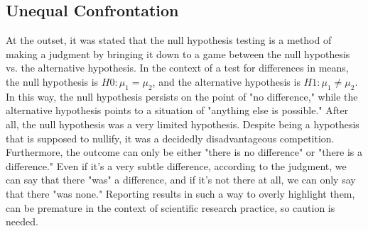\documentclass{ltjsbook}
\begin{document}
{\subsection{Unequal Confrontation}
At the outset, it was stated that the null hypothesis testing is a method of making a judgment by bringing it down to a game between the null hypothesis vs. the alternative hypothesis.
In the context of a test for differences in means, the null hypothesis is $H0:\mu_1=\mu_2$, and the alternative hypothesis is $H1:\mu_1\neq\mu_2$. In this way, the null hypothesis persists on the point of "no difference," while the alternative hypothesis points to a situation of "anything else is possible." After all, the null hypothesis was a very limited hypothesis. Despite being a hypothesis that is supposed to nullify, it was a decidedly disadvantageous competition. Furthermore, the outcome can only be either "there is no difference" or "there is a difference." Even if it's a very subtle difference, according to the judgment, we can say that there "was" a difference, and if it's not there at all, we can only say that there "was none." Reporting results in such a way to overly highlight them, can be premature in the context of scientific research practice, so caution is needed.

}
\end{document}
